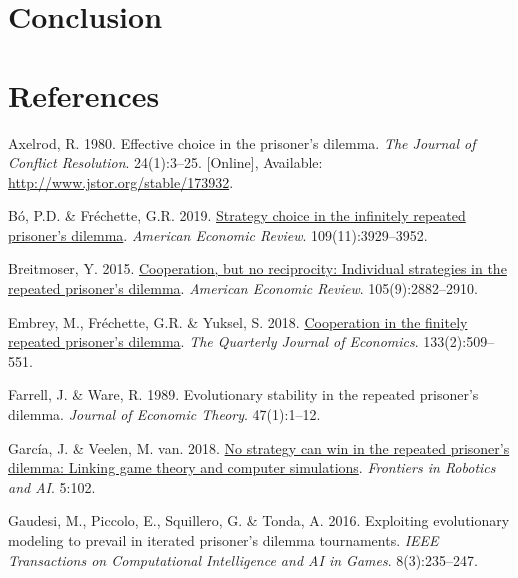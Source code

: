\documentclass[11pt,preprint]{elsarticle}
\numberwithin{equation}{section}
\numberwithin{figure}{section}
\numberwithin{table}{section}
\newlength{\cslhangindent}
\newenvironment{CSLReferences}[2] %
{\begin{list}{}{%
	\setlength{\itemindent}{0pt}
	\setlength{\leftmargin}{0pt}
	\setlength{\parsep}{0pt}
	\ifodd #1
	\setlength{\leftmargin}{\cslhangindent}
	\setlength{\itemindent}{-1\cslhangindent}
	\fi
	\setlength{\itemsep}{#2\baselineskip}}}
{\end{list}}
\begin{document}
\section{Conclusion}\label{conclusion}

\newpage

\section*{References}\label{references}

\label{refs}
\begin{CSLReferences}{1}{1}
Axelrod, R. 1980. Effective choice in the prisoner's dilemma. \emph{The
Journal of Conflict Resolution}. 24(1):3--25. {[}Online{]}, Available:
\url{http://www.jstor.org/stable/173932}.

Bó, P.D. \& Fréchette, G.R. 2019.
\href{https://doi.org/10.1257/aer.20181480}{Strategy choice in the
infinitely repeated prisoner's dilemma}. \emph{American Economic
Review}. 109(11):3929--3952.

Breitmoser, Y. 2015.
\href{https://doi.org/10.1257/aer.20130675}{Cooperation, but no
reciprocity: Individual strategies in the repeated prisoner's dilemma}.
\emph{American Economic Review}. 105(9):2882--2910.

Embrey, M., Fréchette, G.R. \& Yuksel, S. 2018.
\href{https://doi.org/10.1093/qje/qjx033}{Cooperation in the finitely
repeated prisoner's dilemma}. \emph{The Quarterly Journal of Economics}.
133(2):509--551.

Farrell, J. \& Ware, R. 1989. Evolutionary stability in the repeated
prisoner's dilemma. \emph{Journal of Economic Theory}. 47(1):1--12.

García, J. \& Veelen, M. van. 2018.
\href{https://doi.org/10.3389/frobt.2018.00102}{No strategy can win in
the repeated prisoner's dilemma: Linking game theory and computer
simulations}. \emph{Frontiers in Robotics and AI}. 5:102.

Gaudesi, M., Piccolo, E., Squillero, G. \& Tonda, A. 2016. Exploiting
evolutionary modeling to prevail in iterated prisoner's dilemma
tournaments. \emph{IEEE Transactions on Computational Intelligence and
AI in Games}. 8(3):235--247.


\end{CSLReferences}
\end{document}
